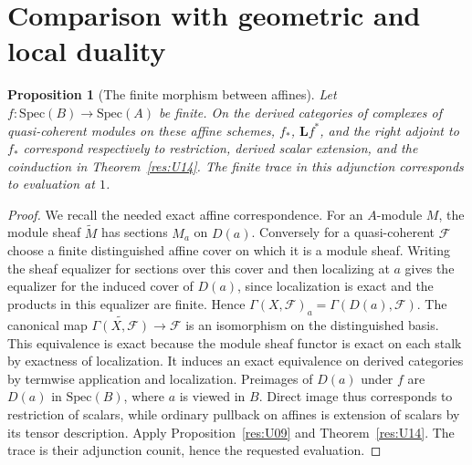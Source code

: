 \documentclass[11pt,oneside,openany]{book}
\newtheorem{proposition}[theorem]{Proposition}
\theoremstyle{definition}
\theoremstyle{remark}
\begin{document}
\section{Comparison with geometric and local duality}

\begin{proposition}[The finite morphism between affines]\label{res:U18}
Let \(f:\mathrm{Spec}(B)\to\mathrm{Spec}(A)\) be finite.
On the derived categories of complexes of quasi-coherent
modules on these affine schemes, \(f_*\), \(\mathbf Lf^*\),
and the right adjoint to \(f_*\) correspond respectively to
restriction, derived scalar extension, and the coinduction
in Theorem~\ref{res:U14}. The finite trace in this adjunction
corresponds to evaluation at \(1\).
\end{proposition}
\begin{proof}
We recall the needed exact affine correspondence.
For an \(A\)-module \(M\), the module sheaf \(\widetilde M\)
has sections \(M_a\) on \(D(a)\).
Conversely for a quasi-coherent \(\mathcal F\) choose a finite
distinguished affine cover on which it is a module sheaf.
Writing the sheaf equalizer for sections over this cover
and then localizing at \(a\) gives the equalizer for the
induced cover of \(D(a)\), since localization is exact
and the products in this equalizer are finite. Hence
\(\Gamma(X,\mathcal F)_a=\Gamma(D(a),\mathcal F)\).
The canonical map \(\widetilde{\Gamma(X,\mathcal F)}\to
\mathcal F\) is an isomorphism on the distinguished basis.
This equivalence is exact because the module sheaf functor
is exact on each stalk by exactness of localization. It
induces an exact equivalence on derived categories by
termwise application and localization. Preimages of \(D(a)\)
under \(f\) are \(D(a)\) in \(\mathrm{Spec}(B)\), where \(a\)
is viewed in \(B\). Direct image thus corresponds to
restriction of scalars, while ordinary pullback on affines
is extension of scalars by its tensor description.
Apply Proposition~\ref{res:U09} and
Theorem~\ref{res:U14}. The trace is their adjunction counit,
hence the requested evaluation.
\end{proof}
\end{document}
